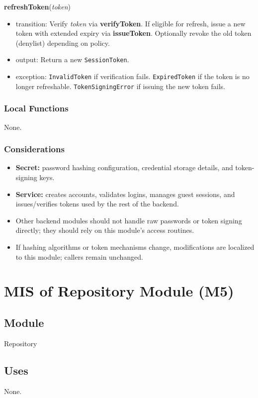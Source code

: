 \documentclass[12pt, titlepage]{article}
\begin{document}
\noindent\textbf{refreshToken}(\textit{token})
\begin{itemize}
    \item transition: Verify \textit{token} via \textbf{verifyToken}. If eligible for refresh, issue a new token with extended expiry via \textbf{issueToken}. Optionally revoke the old token (denylist) depending on policy.
    \item output: Return a new \texttt{SessionToken}.
    \item exception: \texttt{InvalidToken} if verification fails. \texttt{ExpiredToken} if the token is no longer refreshable. \texttt{TokenSigningError} if issuing the new token fails.
\end{itemize}

\subsubsection{Local Functions}
None.

\subsubsection{Considerations}
\begin{itemize}
    \item \textbf{Secret:} password hashing configuration, credential storage details, and token-signing keys.
    \item \textbf{Service:} creates accounts, validates logins, manages guest sessions, and issues/verifies tokens used by the rest of the backend.
    \item Other backend modules should not handle raw passwords or token signing directly; they should rely on this module's access routines.
    \item If hashing algorithms or token mechanisms change, modifications are localized to this module; callers remain unchanged.
\end{itemize}

\newpage
\section{MIS of Repository Module (M5)}\label{sec:repository-module}

\subsection{Module}
Repository

\subsection{Uses}
None.
\end{document}
